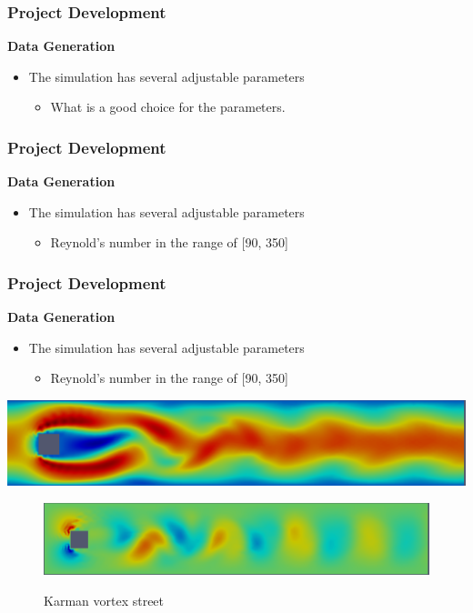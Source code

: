 \documentclass[18pt]{beamer}
\begin{document}
\begin{frame}[t]
  \frametitle{Project Development}
  \large{\textbf{Data Generation}}
  \begin{itemize}
  \item The simulation has several adjustable parameters
    \begin{itemize}
    \item What is a good choice for the parameters.
    \end{itemize}
  \end{itemize}
\end{frame}


\begin{frame}[t]
  \frametitle{Project Development}
  \large{\textbf{Data Generation}}
  \begin{itemize}
  \item The simulation has several adjustable parameters
    \begin{itemize}
    \item Reynold's number in the range of [90, 350]
    \end{itemize}
  \end{itemize}
\end{frame}

\begin{frame}[t]
  \frametitle{Project Development}
  \large{\textbf{Data Generation}}
  \begin{itemize}
  \item The simulation has several adjustable parameters
    \begin{itemize}
    \item Reynold's number in the range of [90, 350]
    \end{itemize}
  \end{itemize}
  \begin{center}
    \includegraphics[scale=0.21]{images/x-direction}
  \end{center}
  \begin{center}
    \begin{figure}[htb]
    \includegraphics[scale=0.21]{images/y-direction} \\
    \caption{Karman vortex street}
    \end{figure}
  \end{center}
\end{frame}
\end{document}
